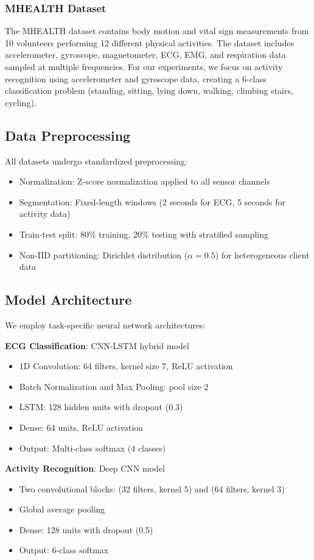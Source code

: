 \documentclass[10pt,conference]{IEEEtran}
\begin{document}
\subsubsection{MHEALTH Dataset}
The MHEALTH dataset contains body motion and vital sign measurements from 10 volunteers performing 12 different physical activities. The dataset includes accelerometer, gyroscope, magnetometer, ECG, EMG, and respiration data sampled at multiple frequencies. For our experiments, we focus on activity recognition using accelerometer and gyroscope data, creating a 6-class classification problem (standing, sitting, lying down, walking, climbing stairs, cycling).

\subsection{Data Preprocessing}
All datasets undergo standardized preprocessing:
\begin{itemize}
    \item Normalization: Z-score normalization applied to all sensor channels
    \item Segmentation: Fixed-length windows (2 seconds for ECG, 5 seconds for activity data)
    \item Train-test split: 80\% training, 20\% testing with stratified sampling
    \item Non-IID partitioning: Dirichlet distribution ($\alpha=0.5$) for heterogeneous client data
\end{itemize}

\subsection{Model Architecture}
We employ task-specific neural network architectures:

\textbf{ECG Classification}: CNN-LSTM hybrid model
\begin{itemize}
    \item 1D Convolution: 64 filters, kernel size 7, ReLU activation
    \item Batch Normalization and Max Pooling: pool size 2
    \item LSTM: 128 hidden units with dropout (0.3)
    \item Dense: 64 units, ReLU activation
    \item Output: Multi-class softmax (4 classes)
\end{itemize}

\textbf{Activity Recognition}: Deep CNN model
\begin{itemize}
    \item Two convolutional blocks: (32 filters, kernel 5) and (64 filters, kernel 3)
    \item Global average pooling
    \item Dense: 128 units with dropout (0.5)
    \item Output: 6-class softmax
\end{itemize}
\end{document}
